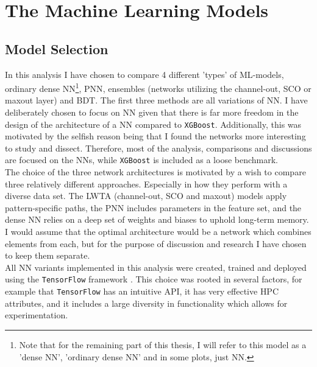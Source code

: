 \section{The Machine Learning Models}
\subsection{Model Selection}
In this analysis I have chosen to compare 4 different 'types' of \ac{ML}-models, ordinary dense \acf{NN}\footnote{Note 
that for the remaining part of this thesis, I will refer to this model as a 'dense \ac{NN}', 'ordinary dense \ac{NN}' 
and in some plots, just \ac{NN}.}, \acf{PNN}, ensembles (networks utilizing the channel-out, \ac{SCO} or maxout layer) 
and \acf{BDT}. The first three methods are all variations of \ac{NN}. I have deliberately 
chosen to focus on \ac{NN} given that there is far more freedom in the design of the architecture
of a \ac{NN} compared to \verb!XGBoost!. Additionally, this was motivated by the selfish reason
being that I found the networks more interesting to study and dissect. Therefore, most of the 
analysis, comparisons and discussions are focused on the \ac{NN}s, while \verb!XGBoost! is included 
as a loose benchmark. 
\\
The choice of the three network architectures is motivated by a wish to compare three relatively different approaches.
Especially in how they perform with a diverse data set. The \ac{LWTA} (channel-out, \ac{SCO} and maxout) models apply pattern-specific paths, 
the \ac{PNN} includes parameters in the feature set, and the dense \ac{NN} relies on a deep set of weights and biases to uphold long-term memory.
I would assume that the optimal architecture would be a network which combines elements from each, but for the purpose of discussion
and research I have chosen to keep them separate. 
\\
All \ac{NN} variants implemented in this analysis were created, trained and deployed using the \verb!TensorFlow! framework \cite{tensorflow}.
This choice was rooted in several factors, for example that \verb!TensorFlow! has an intuitive \ac{API}, it has very effective
\ac{HPC} attributes, and it includes a large diversity in functionality which allows for experimentation.
